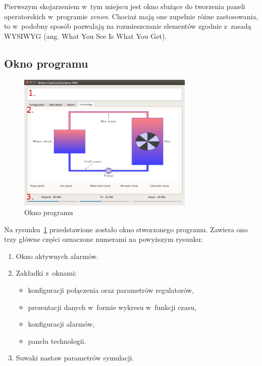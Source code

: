 Pierwszym skojarzeniem w~tym miejscu jest okno służące do tworzenia paneli
operatorskich w~programie \textit{zenon}. Chociaż mają one zupełnie różne
zastosowania, to w~podobny sposób pozwalają na rozmieszczanie elementów zgodnie
z~zasadą WYSIWYG (ang. What You See Is What You Get).

\subsection{Okno programu}
\indent

\begin{figure}[!ht]
    \centering
    \includegraphics[width=0.75\textwidth]{../img/mainwindow.png}
    \caption{Okno programu}
    \label{fig:mainwindow}
\end{figure}

Na rysunku~\ref{fig:mainwindow} przedstawione zostało okno stworzonego programu.
Zawiera ono trzy główne części oznaczone numerami na powyższym rysunku:
\begin{enumerate}
    \item Okno aktywnych alarmów.
    \item Zakładki z~oknami:
        \begin{itemize}
            \item  konfiguracji połączenia oraz parametrów regulatorów,
            \item prezentacji danych w~formie wykresu w~funkcji czasu,
            \item konfiguracji alarmów,
            \item panelu technologii.
        \end{itemize}
    \item Suwaki nastaw parametrów symulacji.
\end{enumerate}


